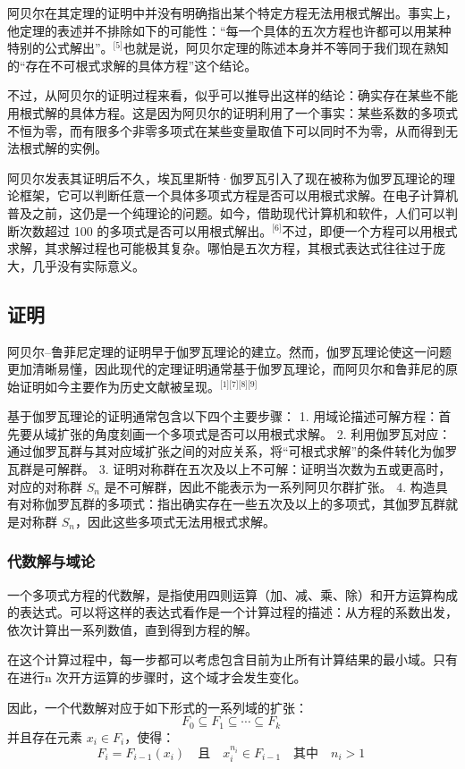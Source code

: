 阿贝尔在其定理的证明中并没有明确指出某个特定方程无法用根式解出。事实上，他定理的表述并不排除如下的可能性：“每一个具体的五次方程也许都可以用某种特别的公式解出”。\(^\text{[5]}\)也就是说，阿贝尔定理的陈述本身并不等同于我们现在熟知的“存在不可根式求解的具体方程”这个结论。

不过，从阿贝尔的证明过程来看，似乎可以推导出这样的结论：确实存在某些不能用根式解的具体方程。这是因为阿贝尔的证明利用了一个事实：某些系数的多项式不恒为零，而有限多个非零多项式在某些变量取值下可以同时不为零，从而得到无法根式解的实例。

阿贝尔发表其证明后不久，埃瓦里斯特·伽罗瓦引入了现在被称为伽罗瓦理论的理论框架，它可以判断任意一个具体多项式方程是否可以用根式求解。在电子计算机普及之前，这仍是一个纯理论的问题。如今，借助现代计算机和软件，人们可以判断次数超过 100 的多项式是否可以用根式解出。\(^\text{[6]}\)不过，即便一个方程可以用根式求解，其求解过程也可能极其复杂。哪怕是五次方程，其根式表达式往往过于庞大，几乎没有实际意义。
\subsection{证明}
阿贝尔–鲁菲尼定理的证明早于伽罗瓦理论的建立。然而，伽罗瓦理论使这一问题更加清晰易懂，因此现代的定理证明通常基于伽罗瓦理论，而阿贝尔和鲁菲尼的原始证明如今主要作为历史文献被呈现。\(^\text{[1][7][8][9]}\)

基于伽罗瓦理论的证明通常包含以下四个主要步骤：
1. 用域论描述可解方程：首先要从域扩张的角度刻画一个多项式是否可以用根式求解。
2. 利用伽罗瓦对应：通过伽罗瓦群与其对应域扩张之间的对应关系，将“可根式求解”的条件转化为伽罗瓦群是可解群。
3. 证明对称群在五次及以上不可解：证明当次数为五或更高时，对应的对称群 $S_n$ 是不可解群，因此不能表示为一系列阿贝尔群扩张。
4. 构造具有对称伽罗瓦群的多项式：指出确实存在一些五次及以上的多项式，其伽罗瓦群就是对称群 $S_n$，因此这些多项式无法用根式求解。
\subsubsection{代数解与域论}
一个多项式方程的代数解，是指使用四则运算（加、减、乘、除）和开方运算构成的表达式。可以将这样的表达式看作是一个计算过程的描述：从方程的系数出发，依次计算出一系列数值，直到得到方程的解。

在这个计算过程中，每一步都可以考虑包含目前为止所有计算结果的最小域。只有在进行n 次开方运算的步骤时，这个域才会发生变化。

因此，一个代数解对应于如下形式的一系列域的扩张：
$$
F_0 \subseteq F_1 \subseteq \cdots \subseteq F_k~
$$
并且存在元素 $x_i \in F_i$，使得：
$$
F_i = F_{i-1}(x_i) \quad \text{且} \quad x_i^{n_i} \in F_{i-1} \quad \text{其中} \quad n_i > 1~
$$

